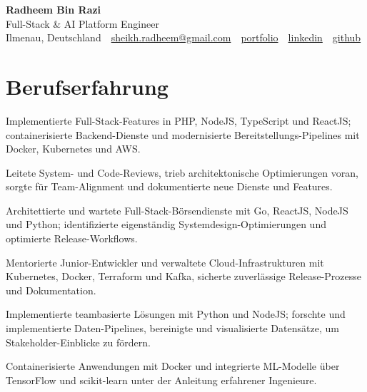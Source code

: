 \documentclass[11pt,a4paper]{resume}
\makeatletter
\newcommand{\Portfolio}{https://radheem.github.io/my-cv}
\newcommand{\PortfolioText}{portfolio}
\newcommand{\GitHub}{https://github.com/radheem}
\newcommand{\LinkedIn}{https://www.linkedin.com/in/radheem-razi}
\newcommand{\Email}{sheikh.radheem@gmail.com}
\makeatother
\begin{document}
\clearpage
{}

\begin{center}
  {\huge\bfseries Radheem Bin Razi}\\[3pt]
  {\large Full-Stack \& AI Platform Engineer}\\[6pt]
  \small
  Ilmenau, Deutschland \,\textbar\,
  \href{mailto:\Email}{\Email} \,\textbar\,
  \href{\Portfolio}{\PortfolioText} \,\textbar\,
  \href{\LinkedIn}{linkedin} \,\textbar\,
  \href{\GitHub}{github}
\end{center}
\vspace{2pt}

\section{Berufserfahrung}

\bullets
  \item Implementierte Full-Stack-Features in PHP, NodeJS, TypeScript und ReactJS; containerisierte Backend-Dienste und modernisierte Bereitstellungs-Pipelines mit Docker, Kubernetes und AWS.
  \item Leitete System- und Code-Reviews, trieb architektonische Optimierungen voran, sorgte für Team-Alignment und dokumentierte neue Dienste und Features.
\bulletsend
\vspace{3pt}
\bullets
  \item Architettierte und wartete Full-Stack-Börsendienste mit Go, ReactJS, NodeJS und Python; identifizierte eigenständig Systemdesign-Optimierungen und optimierte Release-Workflows.
  \item Mentorierte Junior-Entwickler und verwaltete Cloud-Infrastrukturen mit Kubernetes, Docker, Terraform und Kafka, sicherte zuverlässige Release-Prozesse und Dokumentation.
\bulletsend
\vspace{3pt}
\bullets
  \item Implementierte teambasierte Lösungen mit Python und NodeJS; forschte und implementierte Daten-Pipelines, bereinigte und visualisierte Datensätze, um Stakeholder-Einblicke zu fördern.
  \item Containerisierte Anwendungen mit Docker und integrierte ML-Modelle über TensorFlow und scikit-learn unter der Anleitung erfahrener Ingenieure.
\bulletsend
\vspace{3pt}
\end{document}
